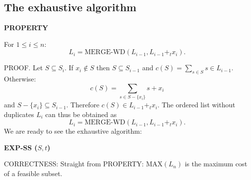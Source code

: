 \subsection{The exhaustive algorithm}
\begin{notesresult}
\textbf{PROPERTY}

For $1\leq i\leq n$:
\[L_i=\mathrm{MERGE\text{-}WD}(L_{i-1},L_{i-1}+_t x_i).\]
\end{notesresult}
PROOF. Let $S\subseteq S_i$. If $x_i\notin S$ then $S\subseteq S_{i-1}$ and $c(S)=\sum_{s\in S}s\in L_{i-1}$. Otherwise:
\[c(S)=\sum_{s\in S-\{x_i\}}s+x_i\]
and $S-\{x_i\}\subseteq S_{i-1}$. Therefore $c(S)\in L_{i-1}+_t x_i$.
The ordered list without duplicates $L_i$ can thus be obtained as
\[L_i=\mathrm{MERGE\text{-}WD}(L_{i-1},L_{i-1}+_t x_i).\]
We are ready to see the exhaustive algorithm:
\begin{notesalgorithm}
\textbf{EXP-SS ($S,t$)}
\begin{notespseudocode}
\end{notespseudocode}
\end{notesalgorithm}
\begin{notesresult}
CORRECTNESS: Straight from PROPERTY: MAX$(L_n)$ is the maximum cost of a feasible subset.
\end{notesresult}
